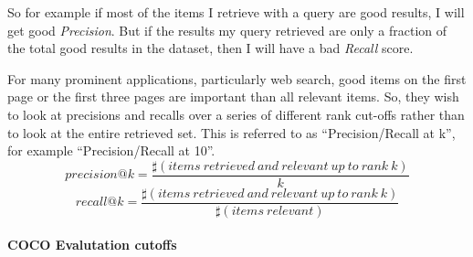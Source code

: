 So for example if most of the items I retrieve with a query are good results, I will get good \emph{Precision}. But if the results my query retrieved are only a fraction of the total good results in the dataset, then I will have a bad \emph{Recall} score.

For many prominent applications, particularly web search, good items on the first page or the first three pages are important than all relevant items. So, they wish to look at precisions and recalls over a series of different rank cut-offs rather than to look at the entire retrieved set. This is referred to as ``Precision/Recall at k'', for example ``Precision/Recall at 10''. 
\begin{equation}
precision@k=\frac{\sharp(items \: retrieved \: and \: relevant \: up \: to \: rank \: k)}{k}
\end{equation}
\begin{equation}
recall@k=\frac{\sharp(items \: retrieved \: and \: relevant \: up \: to \: rank \: k)}{\sharp(items \: relevant)}
\end{equation}

\paragraph{COCO Evalutation cutoffs}

